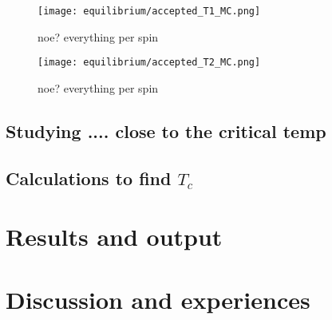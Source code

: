 \documentclass[11pt,a4wide]{article}
\begin{document}
\begin{figure}[htp]
\caption{noe? everything per spin}
\centering
\texttt{[image: equilibrium/accepted\_T1\_MC.png]}
\label{fig: accepted T1}
\end{figure}

\begin{figure}[htp]
\caption{noe? everything per spin}
\centering
\texttt{[image: equilibrium/accepted\_T2\_MC.png]}
\label{fig:  accepted T2}
\end{figure}



\subsection{Studying .... close to the critical temp}


\subsection{Calculations to find $T_c$}


\section{Results and output}


\section{Discussion and experiences}





\newpage
\end{document}

